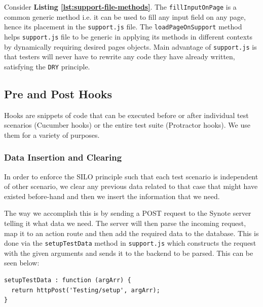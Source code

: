 Consider \textbf{Listing \ref{lst:support-file-methods}}. The \texttt{fillInputOnPage} is a common generic method i.e. it can be used to fill any input field on any page, hence its placement in the \texttt{support.js} file. The \texttt{loadPageOnSupport} method helps \texttt{support.js} file to be generic in applying its methods in different contexts by dynamically requiring desired pages objects. Main advantage of \texttt{support.js} is that testers will never have to rewrite any code they have already written, satisfying the \texttt{DRY} principle.

\subsection{Pre and Post Hooks}
\label{subsec:pre-and-post-hooks}

Hooks are snippets of code that can be executed before or after individual test scenarios (Cucumber hooks) or the entire test suite (Protractor hooks). We use them for a variety of purposes.

\subsubsection{Data Insertion and Clearing}
\label{subsubsec:data-insertion-and-clearing}
In order to enforce the SILO principle such that each test scenario is independent of other scenario, we clear any previous data related to that case that might have existed before-hand and then we insert the information that we need.

The way we accomplish this is by sending a POST request to the Synote server telling it what data we need. The server will then parse the incoming request, map it to an action route and then add the required data to the database. This is done via the \texttt{setupTestData} method in \texttt{support.js} which constructs the request with the given arguments and sends it to the backend to be parsed. This can be seen below:

\begin{listing}[H]
\begin{verbatim}
setupTestData : function (argArr) {
  return httpPost('Testing/setup', argArr);
}
\end{verbatim}
\label{lst:inserting-test-data}
\end{listing}


